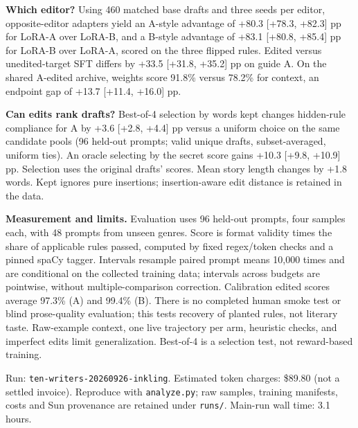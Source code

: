 \documentclass[10pt,letterpaper]{article}
\begin{document}
\textbf{Which editor?} Using 460 matched base drafts and three seeds per editor,
opposite-editor adapters yield an A-style advantage of +80.3 [+78.3, +82.3] pp for LoRA-A over LoRA-B, and a
B-style advantage of +83.1 [+80.8, +85.4] pp for LoRA-B over LoRA-A, scored on the three flipped
rules. Edited versus unedited-target SFT differs by +33.5 [+31.8, +35.2] pp on guide A.
On the shared A-edited archive, weights score 91.8\% versus 78.2\% for context,
an endpoint gap of +13.7 [+11.4, +16.0] pp.

\textbf{Can edits rank drafts?} Best-of-4 selection by words kept changes hidden-rule
compliance for A by +3.6 [+2.8, +4.4] pp versus a uniform choice on the same candidate pools
(96 held-out prompts; valid unique drafts, subset-averaged, uniform ties). An oracle selecting by
the secret score gains +10.3 [+9.8, +10.9] pp. Selection uses the original drafts' scores.
Mean story length changes by +1.8 words.
Kept ignores pure insertions; insertion-aware edit distance is retained in the data.

\textbf{Measurement and limits.} Evaluation uses 96 held-out prompts, four samples
each, with 48 prompts from unseen genres. Score is format validity times the share
of applicable rules passed, computed by fixed regex/token checks and a pinned
spaCy tagger. Intervals resample paired prompt means 10,000 times and are conditional
on the collected training data; intervals across budgets are pointwise, without
multiple-comparison correction. Calibration edited scores average 97.3\% (A) and 99.4\% (B).
There is no completed human smoke test or blind prose-quality evaluation;
this tests recovery of planted rules, not literary taste. Raw-example context, one
live trajectory per arm, heuristic checks, and imperfect edits limit generalization.
Best-of-4 is a selection test, not reward-based training.

\vfill
{\footnotesize\color{gray}Run: \texttt{ten-writers-20260926-inkling}. Estimated token charges: \$89.80
(not a settled invoice). Reproduce with \texttt{analyze.py}; raw samples, training
manifests, costs and Sun provenance are retained under \texttt{runs/}.
Main-run wall time: 3.1 hours.}
\end{document}
